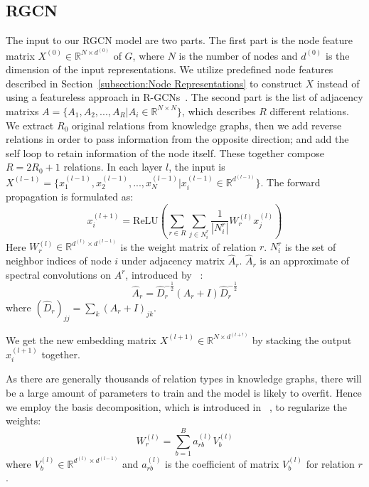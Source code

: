 	\subsection{RGCN}
	\label{section:rgcn}
	The input to our RGCN model are two parts. The first part is the node feature matrix $X^{(0)} \in \mathbb{R}^{N \times d^{(0)}}$ of $G$, where $N$ is the number of nodes and $d^{(0)}$ is the dimension of the input representations. We utilize predefined node features described in Section~\ref{subsection:Node Representations} to construct $X$ instead of using a featureless approach in R-GCNs~\cite{Schlichtkrull2017Modeling}.
	The second part is the list of adjacency matrixs $A=\{A_1,A_2,...,A_R |A_i \in \mathbb{R}^{N \times N} \}$, which describes $R$ different relations. We extract $R_0$ original relations from knowledge graphs, then we add reverse relations in order to pass information from the opposite direction; and add the self loop to retain information of the node itself. These together compose $R=2R_0+1$ relations.
	In each layer $l$, the input is $X^{(l-1)} = \{x^{(l-1)}_1,x^{(l-1)}_2,...,x^{(l-1)}_{N} |x^{(l-1)}_{i} \in \mathbb{R}^{d^{(l-1)}}\}$. The forward propagation is formulated as:
	\begin{equation}
	x_i^{(l+1)}=\mathrm{ReLU} (\sum\limits_{r \in R}\sum\limits_{j \in N_i^r} \frac{1}{|N_i^r|}W_r^{(l)}x_j^{(l)})
	\end{equation}
	Here $W_r^{(l)} \in \mathbb{R}^{d^{(l)} \times d^{(l-1)}}$ is the weight matrix of relation $r$. $N_i^r$ is the set of neighbor indices of node $i$ under adjacency matrix $\hat A_r$. $\hat A_r$ is an approximate of spectral convolutions on $A^r$, introduced by ~\cite{Kipf2016Semi}:
	\begin{equation}
	\hat A_r=\hat D_r^{- \frac{1}{2}}(A_r+I)\hat D_r^{- \frac{1}{2}}
	\end{equation}
	where $(\hat D_r)_{jj}=\sum_k(A_r+I)_{jk}$.
	
	We get the new embedding matrix $X^{(l+1)} \in \mathbb{R}^{N \times d^{(l+!)}}$ by stacking the output $x_i^{(l+1)}$ together.
	
	As there are generally thousands of relation types in knowledge graphs, there will be a large amount of parameters to train and the model is likely to overfit. Hence we employ the basis decomposition, which is introduced in ~\cite{Schlichtkrull2017Modeling}, to regularize the weights:
	\begin{equation}
	W_r^{(l)}=\sum\limits_{b=1}^B a_{rb}^{(l)}V_b^{(l)}
	\end{equation}
	where $V_b^{(l)} \in \mathbb{R}^{d^{(l)} \times d^{(l-1)}}$ and $a_{rb}^{(l)}$ is the coefficient of matrix $V_b^{(l)}$ for relation $r$.
	
